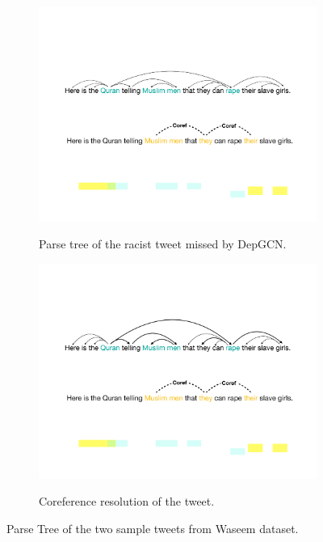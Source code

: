 \begin{figure}[tbh]
  \begin{subfigure}{\textwidth}
  \centering
    \includegraphics[scale=0.65]{figures/example3_key}
    \label{fig:example3}\caption{Parse tree of the racist tweet missed by DepGCN.}
    \end{subfigure}
    \begin{subfigure}{\textwidth}
    \centering
      \includegraphics[scale=0.65]{figures/example3_2_key}
      \label{fig:examplecoref}\caption{Coreference resolution of the tweet.}
      \end{subfigure}

  \label{fig:examples}
  \caption{Parse Tree of the two sample tweets from Waseem dataset.}
\end{figure}

